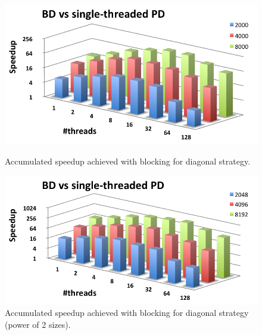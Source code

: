 \documentclass[../thesis]{subfiles}
\begin{document}
	\begin{figure}[t]
		\begin{minipage}{0.48\textwidth}
			\centering
			\includegraphics[width=\textwidth]{assets/images/multicore/blocking-multithread-speedup.png}
			\captionsetup{font=small}
			\caption{Accumulated speedup achieved with blocking for diagonal strategy.}
			\label{fig:multicore:block:diagonal:speedup:accumulated}
		\end{minipage}
		\hfill
		\begin{minipage}{0.48\textwidth}
			\centering
			\includegraphics[width=\textwidth]{assets/images/multicore/blocking-multithread-speedup-power2.png}
			\captionsetup{font=small}
			\caption{Accumulated speedup achieved with blocking for diagonal strategy (power of 2 sizes).}
			\label{fig:multicore:block:diagonal:speedup:accumulated:strange}
		\end{minipage}
	\end{figure}
\end{document}
